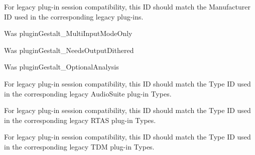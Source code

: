 \begin{DoxyRefList}
\item[\label{a00385__porting_notes000041}%
\hypertarget{a00385__porting_notes000041}{}%
global\+Scope$>$ Member \hyperlink{a00283_a6571f4e41a5dd06e4067249228e2249ea996465cca29a2a15291d1c788ac5728c}{A\+A\+X\+\_\+e\+Property\+\_\+\+Manufacturer\+I\+D} ]For legacy plug-\/in session compatibility, this I\+D should match the Manufacturer I\+D used in the corresponding legacy plug-\/ins.  
\item[\label{a00385__porting_notes000054}%
\hypertarget{a00385__porting_notes000054}{}%
global\+Scope$>$ Member \hyperlink{a00283_a6571f4e41a5dd06e4067249228e2249eaa15cf3edd899af4a98fa18fcdfdeb9d6}{A\+A\+X\+\_\+e\+Property\+\_\+\+Multi\+Input\+Mode\+Only} ]Was plugin\+Gestalt\+\_\+\+Multi\+Input\+Mode\+Only  
\item[\label{a00385__porting_notes000058}%
\hypertarget{a00385__porting_notes000058}{}%
global\+Scope$>$ Member \hyperlink{a00283_a6571f4e41a5dd06e4067249228e2249ea38a26f7d914d391cef1f71acfb98a2ec}{A\+A\+X\+\_\+e\+Property\+\_\+\+Needs\+Output\+Dithered} ]Was plugin\+Gestalt\+\_\+\+Needs\+Output\+Dithered  
\item[\label{a00385__porting_notes000049}%
\hypertarget{a00385__porting_notes000049}{}%
global\+Scope$>$ Member \hyperlink{a00283_a6571f4e41a5dd06e4067249228e2249ea5a2bacb421fc36f890a121f01a9e72ba}{A\+A\+X\+\_\+e\+Property\+\_\+\+Optional\+Analysis} ]Was plugin\+Gestalt\+\_\+\+Optional\+Analysis  
\item[\label{a00385__porting_notes000044}%
\hypertarget{a00385__porting_notes000044}{}%
global\+Scope$>$ Member \hyperlink{a00283_a6571f4e41a5dd06e4067249228e2249ead3344696b8298a8b254add3d039ea927}{A\+A\+X\+\_\+e\+Property\+\_\+\+Plug\+In\+I\+D\+\_\+\+Audio\+Suite} ]For legacy plug-\/in session compatibility, this I\+D should match the Type I\+D used in the corresponding legacy Audio\+Suite plug-\/in Types.  
\item[\label{a00385__porting_notes000043}%
\hypertarget{a00385__porting_notes000043}{}%
global\+Scope$>$ Member \hyperlink{a00283_a6571f4e41a5dd06e4067249228e2249ea89ca3dd6e96895cda14976c1b1ceb826}{A\+A\+X\+\_\+e\+Property\+\_\+\+Plug\+In\+I\+D\+\_\+\+Native} ]For legacy plug-\/in session compatibility, this I\+D should match the Type I\+D used in the corresponding legacy R\+T\+A\+S plug-\/in Types.  
\item[\label{a00385__porting_notes000045}%
\hypertarget{a00385__porting_notes000045}{}%
global\+Scope$>$ Member \hyperlink{a00283_a6571f4e41a5dd06e4067249228e2249ea75f174df4efbeca86eaada126c1d9214}{A\+A\+X\+\_\+e\+Property\+\_\+\+Plug\+In\+I\+D\+\_\+\+T\+I} ]For legacy plug-\/in session compatibility, this I\+D should match the Type I\+D used in the corresponding legacy T\+D\+M plug-\/in Types.  

\end{DoxyRefList}

